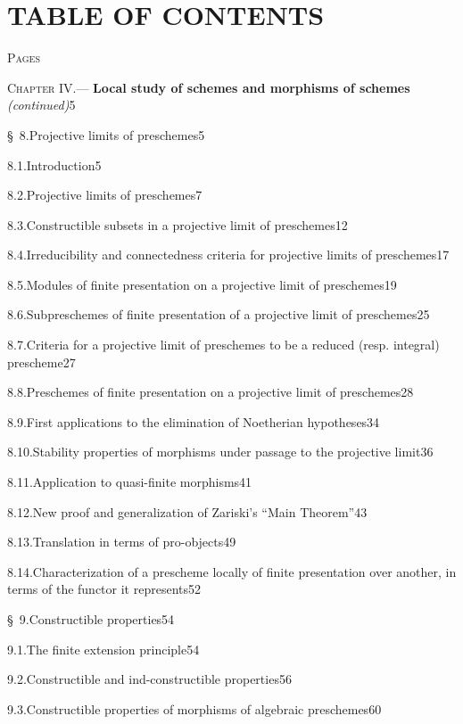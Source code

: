 \let\EGAIVthreeTerm\relax
\endgroup

\clearpage
\thispagestyle{empty}
\null

\clearpage
{}
{}
\section*{TABLE OF CONTENTS}

\begingroup
\small
\setlength{\parindent}{0pt}
\setlength{\parskip}{1.5pt}
\hfill\textsc{Pages}\par
\newcommand{\EGAIVthreeContentsLine}[3]{#1\quad #2\unskip\nobreak\hspace{0.4em}\nobreak\dotfill\nobreak\mbox{#3}\par}

\EGAIVthreeContentsLine{\textsc{Chapter IV.}}{--- \textbf{Local study of schemes and morphisms of schemes} \emph{(continued)}}{5}
\EGAIVthreeContentsLine{\S~8.}{Projective limits of preschemes}{5}
\EGAIVthreeContentsLine{8.1.}{Introduction}{5}
\EGAIVthreeContentsLine{8.2.}{Projective limits of preschemes}{7}
\EGAIVthreeContentsLine{8.3.}{Constructible subsets in a projective limit of preschemes}{12}
\EGAIVthreeContentsLine{8.4.}{Irreducibility and connectedness criteria for projective limits of preschemes}{17}
\EGAIVthreeContentsLine{8.5.}{Modules of finite presentation on a projective limit of preschemes}{19}
\EGAIVthreeContentsLine{8.6.}{Subpreschemes of finite presentation of a projective limit of preschemes}{25}
\EGAIVthreeContentsLine{8.7.}{Criteria for a projective limit of preschemes to be a reduced (resp. integral) prescheme}{27}
\EGAIVthreeContentsLine{8.8.}{Preschemes of finite presentation on a projective limit of preschemes}{28}
\EGAIVthreeContentsLine{8.9.}{First applications to the elimination of Noetherian hypotheses}{34}
\EGAIVthreeContentsLine{8.10.}{Stability properties of morphisms under passage to the projective limit}{36}
\EGAIVthreeContentsLine{8.11.}{Application to quasi-finite morphisms}{41}
\EGAIVthreeContentsLine{8.12.}{New proof and generalization of Zariski's ``Main Theorem''}{43}
\EGAIVthreeContentsLine{8.13.}{Translation in terms of pro-objects}{49}
\EGAIVthreeContentsLine{8.14.}{Characterization of a prescheme locally of finite presentation over another, in terms of the functor it represents}{52}

\EGAIVthreeContentsLine{\S~9.}{Constructible properties}{54}
\EGAIVthreeContentsLine{9.1.}{The finite extension principle}{54}
\EGAIVthreeContentsLine{9.2.}{Constructible and ind-constructible properties}{56}
\EGAIVthreeContentsLine{9.3.}{Constructible properties of morphisms of algebraic preschemes}{60}

